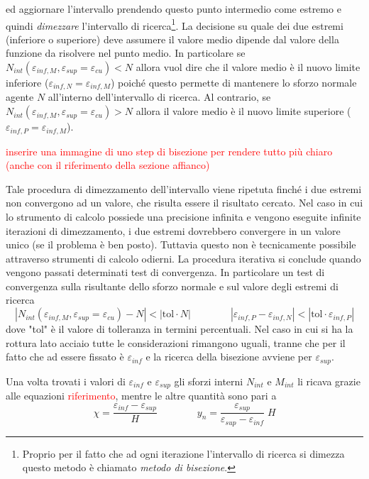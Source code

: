 \documentclass[10pt]{article}
\begin{document}
ed aggiornare l'intervallo prendendo questo punto intermedio come estremo e quindi \textit{dimezzare} l'intervallo di ricerca\footnote{Proprio per il fatto che ad ogni iterazione l'intervallo di ricerca si dimezza questo metodo è chiamato \emph{metodo di bisezione}.}. La decisione su quale dei due estremi (inferiore o superiore) deve assumere il valore medio dipende dal valore della funzione da risolvere nel punto medio. In particolare se $N_{int}(\varepsilon_{inf,M},\varepsilon_{sup}=\varepsilon_{cu})<N$ allora vuol dire che il valore medio è il nuovo limite inferiore ($\varepsilon_{inf,N} = \varepsilon_{inf,M}$) poiché questo permette di mantenere lo sforzo normale agente $N$ all'interno dell'intervallo di ricerca. Al contrario, se $N_{int}(\varepsilon_{inf,M},\varepsilon_{sup}=\varepsilon_{cu})>N$ allora il valore medio è il nuovo limite superiore ($\varepsilon_{inf,P} = \varepsilon_{inf,M}$).

\begin{center}
\textcolor{red}{inserire una immagine di uno step di bisezione per rendere tutto più chiaro (anche con il riferimento della sezione affianco)}
\end{center}

Tale procedura di dimezzamento dell'intervallo viene ripetuta finché i due estremi non convergono ad un valore, che risulta essere il risultato cercato. Nel caso in cui lo strumento di calcolo possiede una precisione infinita e vengono eseguite infinite iterazioni di dimezzamento, i due estremi dovrebbero convergere in un valore unico (se il problema è ben posto). Tuttavia questo non è tecnicamente possibile attraverso strumenti di calcolo odierni. La procedura iterativa si conclude quando vengono passati determinati test di convergenza. In particolare un test di convergenza sulla risultante dello sforzo normale e sul valore degli estremi di ricerca
\begin{equation}
\left| N_{int}(\varepsilon_{inf,M},\varepsilon_{sup}=\varepsilon_{cu}) - N \right| < \left| \text{tol} \cdot N \right|
\qquad \qquad
\left| \varepsilon_{inf,P} - \varepsilon_{inf,N} \right| < \left| \text{tol} \cdot \varepsilon_{inf,P} \right|
\end{equation}
dove "tol" è il valore di tolleranza in termini percentuali.
Nel caso in cui si ha la rottura lato acciaio tutte le considerazioni rimangono uguali, tranne che per il fatto che ad essere fissato è $\varepsilon_{inf}$ e la ricerca della bisezione avviene per $\varepsilon_{sup}$.

Una volta trovati i valori di $\varepsilon_{inf}$ e $\varepsilon_{sup}$ gli sforzi interni $N_{int}$ e $M_{int}$ li ricava grazie alle equazioni \textcolor{red}{riferimento}, mentre le altre quantità sono pari a 
\begin{equation}
\chi = \frac{\varepsilon_{inf} - \varepsilon_{sup}}{H} 
\qquad \qquad
y_n  = \frac{\varepsilon_{sup}}{\varepsilon_{sup}-\varepsilon_{inf}} \; H
\end{equation}
\end{document}
